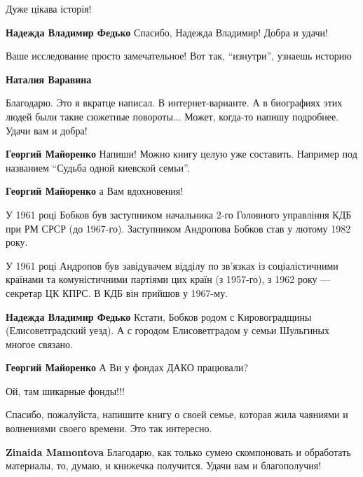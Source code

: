 \begin{itemize}
Дуже цікава історія!

\textbf{Надежда Владимир Федько} Спасибо, Надежда Владимир! Добра и удачи!

Ваше исследование просто замечательное! Вот так, \enquote{изнутри}, узнаешь историю

\begin{itemize} %
\textbf{Наталия Варавина} 

Благодарю. Это я вкратце написал. В интернет-варианте. А в биографиях этих
людей были такие сюжетные повороты... Может, когда-то напишу подробнее. Удачи
вам и добра!

\textbf{Георгий Майоренко} Напиши! Можно книгу целую уже составить. Например под названием \enquote{Судьба одной киевской семьи}.

\textbf{Георгий Майоренко} а Вам вдохновения!
\end{itemize} %


У 1961 році Бобков був заступником начальника 2-го Головного управління КДБ при
РМ СРСР (до 1967-го). Заступником Андропова Бобков став у лютому 1982 року.

У 1961 році Андропов був завідувачем відділу по зв'язках із соціалістичними
країнами та комуністичними партіями цих країн (з 1957-го), з 1962 року —
секретар ЦК КПРС. В КДБ він прийшов у 1967-му.

\begin{itemize} %
\textbf{Надежда Владимир Федько} Кстати, Бобков родом с Кировоградщины (Елисоветградский уезд). А с городом Елисоветградом у семьи Шульгиных многое связано.

\textbf{Георгий Майоренко} А Ви у фондах ДАКО працювали?

Ой, там шикарные фонды!!!
\end{itemize} %


Спасибо, пожалуйста, напишите книгу о своей семье, которая жила чаяниями и
волнениями своего времени. Это так интересно.

\begin{itemize} %
\textbf{Zinaida Mamontova} Благодарю, как только сумею скомпоновать и обработать материалы, то, думаю, и книжечка получится. Удачи вам и благополучия!
\end{itemize} %


\end{itemize}
